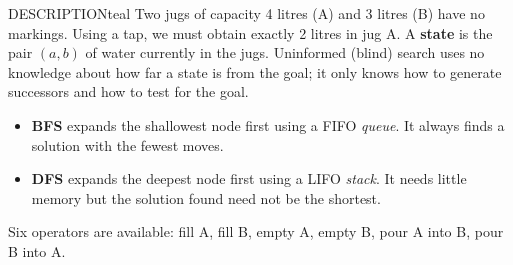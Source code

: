 \documentclass[11pt,a4paper]{article}
\newenvironment{descr}{\begin{secbox}{DESCRIPTION}{teal}}{\end{secbox}}
\begin{document}
\begin{descr}
Two jugs of capacity 4 litres (A) and 3 litres (B) have no markings. Using a tap, we must obtain exactly 2 litres in jug A. A \textbf{state} is the pair $(a,b)$ of water currently in the jugs. Uninformed (blind) search uses no knowledge about how far a state is from the goal; it only knows how to generate successors and how to test for the goal.
\begin{itemize}
  \item \textbf{BFS} expands the shallowest node first using a FIFO \emph{queue}. It always finds a solution with the fewest moves.
  \item \textbf{DFS} expands the deepest node first using a LIFO \emph{stack}. It needs little memory but the solution found need not be the shortest.
\end{itemize}
Six operators are available: fill A, fill B, empty A, empty B, pour A into B, pour B into A.
\end{descr}
\end{document}
